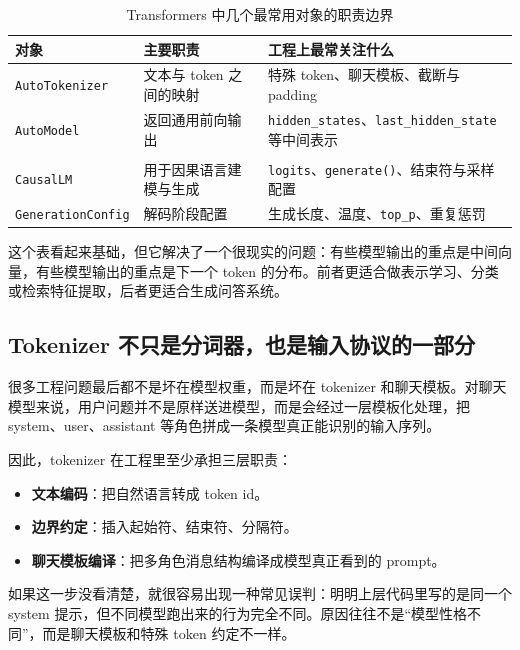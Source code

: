 \begin{table}[H]
\centering
\small
\begin{tabularx}{\textwidth}{>{\raggedright\arraybackslash}p{3.2cm}>{\raggedright\arraybackslash}p{3.3cm}>{\raggedright\arraybackslash}X}
\toprule
\textbf{对象} & \textbf{主要职责} & \textbf{工程上最常关注什么} \\
\midrule
\texttt{AutoTokenizer} & 文本与 token 之间的映射 & 特殊 token、聊天模板、截断与 padding \\
\texttt{AutoModel} & 返回通用前向输出 & \texttt{hidden\_states}、\texttt{last\_hidden\_state} 等中间表示 \\
\makecell[l]{\texttt{AutoModelFor}\\\texttt{CausalLM}} & 用于因果语言建模与生成 & \texttt{logits}、\texttt{generate()}、结束符与采样配置 \\
\texttt{GenerationConfig} & 解码阶段配置 & 生成长度、温度、\texttt{top\_p}、重复惩罚 \\
\bottomrule
\end{tabularx}
\caption{Transformers 中几个最常用对象的职责边界}
\label{tab:transformers-objects}
\end{table}

这个表看起来基础，但它解决了一个很现实的问题：有些模型输出的重点是中间向量，有些模型输出的重点是下一个 token 的分布。前者更适合做表示学习、分类或检索特征提取，后者更适合生成问答系统。

\subsection{Tokenizer 不只是分词器，也是输入协议的一部分}
很多工程问题最后都不是坏在模型权重，而是坏在 tokenizer 和聊天模板。对聊天模型来说，用户问题并不是原样送进模型，而是会经过一层模板化处理，把 system、user、assistant 等角色拼成一条模型真正能识别的输入序列。

因此，tokenizer 在工程里至少承担三层职责：
\begin{itemize}
  \item \textbf{文本编码}：把自然语言转成 token id。
  \item \textbf{边界约定}：插入起始符、结束符、分隔符。
  \item \textbf{聊天模板编译}：把多角色消息结构编译成模型真正看到的 prompt。
\end{itemize}

如果这一步没看清楚，就很容易出现一种常见误判：明明上层代码里写的是同一个 system 提示，但不同模型跑出来的行为完全不同。原因往往不是“模型性格不同”，而是聊天模板和特殊 token 约定不一样。

